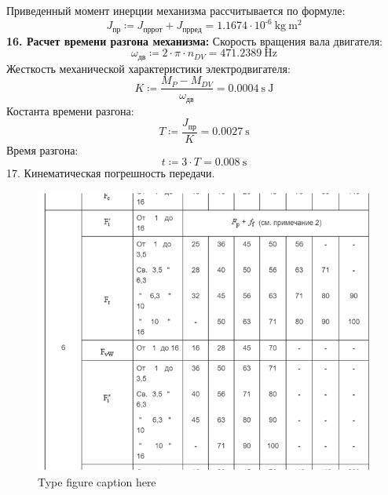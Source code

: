 \documentclass{article}
\newcommand{\defeq}{\coloneq} %
\begin{document}
\colorbox[HTML]{000000}{Приведенный момент инерции механизма рассчитывается по формуле:}\newline
\begin{equation*}
J_{пр} \defeq J_{пррот}+J_{прред} = {1.1674 \cdot 10^{ \operatorname{-} 6} \: \mathrm{kg} \: \mathrm{m}^{2}}
\end{equation*}
\colorbox[HTML]{000000}{\textbf{16. Расчет времени разгона механизма:}}\newline
\colorbox[HTML]{000000}{Скорость вращения вала двигателя:}\newline
\begin{equation*}
ω_{дв} \defeq 2 \cdot {\pi} \cdot n_{DV} = {471.2389 \: \mathrm{Hz}}
\end{equation*}
\colorbox[HTML]{000000}{Жесткость механической характеристики электродвигателя:}\newline
\begin{equation*}
K \defeq \frac{M_{P}-M_{DV}}{ω_{дв}} = {0.0004 \: \mathrm{s} \: \mathrm{J}}
\end{equation*}
\colorbox[HTML]{000000}{Костанта времени разгона:}\newline
\begin{equation*}
T \defeq \frac{J_{пр}}{K} = {0.0027 \: \mathrm{s}}
\end{equation*}
\colorbox[HTML]{000000}{Время разгона:}\newline
\begin{equation*}
t \defeq 3 \cdot T = {0.008 \: \mathrm{s}}
\end{equation*}
\colorbox[HTML]{000000}{17. Кинематическая погрешность передачи.}\newline
\begin{figure}[h!]
 \begin{center}
  \includegraphics[max width=\textwidth]{calculations/782.png}
  \caption{Type figure caption here}
  \label{fig:782}
 \end{center}
\end{figure}
\end{document}
